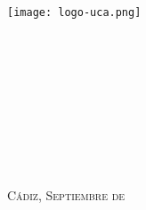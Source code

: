 


\begin{titlepage}

  \begin{center}

    \texttt{[image: logo-uca.png]} \\
    
    \vspace{2.5cm}
    

\LARGE{\textbf{\MakeUppercase\esi}} \\
    
    \vspace{1.0cm}
    
    \Large{\textbf{\MakeUppercase\degree}} \\
    
    \vspace{1.0cm}
    
	\HRule \\[0.4cm]
	{ \LARGE \bfseries \textsc \pfctitle}\\[0.2cm]
	\HRule \\[1.25 cm]
    
    \vspace{2.5cm}
    
    \Large{\textsc \authorname} \\
  
    \vspace{0.5cm}
    
	{\textsc{\large C\'adiz, Septiembre de }}
    
  \end{center}
\end{titlepage}